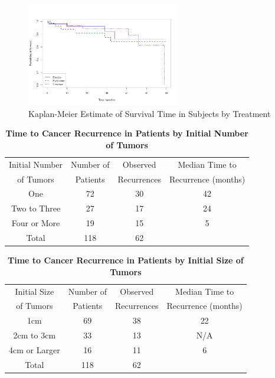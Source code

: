 \documentclass{article}
\begin{document}
	  \begin{figure}[h!]
		\centering
		\tiny
		  \centering
		  \tiny
		  \includegraphics[width=0.6\textwidth]{graphs/case1/recurrance~death.png}
		  \caption{Kaplan-Meier Estimate of Survival Time in Subjects by Treatment}
		  \label{death~treat}
	\end{figure}

	\begin{table}[H]
		\centering
		\footnotesize
		\caption{\textbf{Time to Cancer Recurrence in Patients by Initial Number of Tumors}}
		\begin{tabular}{cccc}
			\toprule
			\multicolumn{1}{c}{Initial Number} & 
			\multicolumn{1}{c}{Number of} & 
			\multicolumn{1}{c}{Observed} & 
			\multicolumn{1}{c}{Median Time to} \\
			\multicolumn{1}{c}{of Tumors} & 
			\multicolumn{1}{c}{Patients} & 
			\multicolumn{1}{c}{Recurrences} & 
			\multicolumn{1}{c}{Recurrence (months)} \\
			\midrule
			One            & 72  & 30 & 42 \\
			Two to Three   & 27  & 17 & 24 \\
			Four or More   & 19  & 15 & 5  \\
			\midrule
			Total          & 118 & 62 &  \\
			\bottomrule
		\end{tabular}
	\end{table}

	\begin{table}[H]
		\centering
		\footnotesize
		\caption{\textbf{Time to Cancer Recurrence in Patients by Initial Size of Tumors}}
		\begin{tabular}{cccc}
			\toprule
			\multicolumn{1}{c}{Initial Size} & 
			\multicolumn{1}{c}{Number of} & 
			\multicolumn{1}{c}{Observed} & 
			\multicolumn{1}{c}{Median Time to} \\
			\multicolumn{1}{c}{of Tumors} & 
			\multicolumn{1}{c}{Patients} & 
			\multicolumn{1}{c}{Recurrences} & 
			\multicolumn{1}{c}{Recurrence (months)} \\
			\midrule
			1cm             & 69  & 38 & 22 \\
			2cm to 3cm      & 33  & 13 & N/A \\
			4cm or Larger   & 16  & 11 & 6  \\
			\midrule
			Total           & 118 & 62 &    \\
			\bottomrule
		\end{tabular}
	\end{table}
\end{document}
